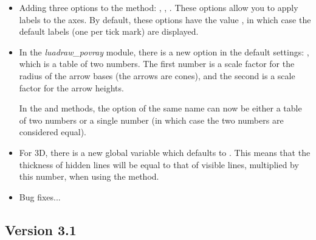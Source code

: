 \begin{itemize}
    \item Adding three options to the  method: , , . These options allow you to apply labels to the axes. By default, these options have the value \nil, in which case the default labels (one per tick mark) are displayed.

    \item In the \emph{luadraw\_povray} module, there is a new option in the default settings: , which is a table of two numbers. The first number is a scale factor for the radius of the arrow bases (the arrows are cones), and the second is a scale factor for the arrow heights.

    In the  and  methods, the option of the same name can now be either a table of two numbers or a single number (in which case the two numbers are considered equal).
    
    \item For 3D, there is a new global variable  which defaults to . This means that the thickness of hidden lines will be equal to that of visible lines, multiplied by this number, when using the  method.
    
    \item Bug fixes...
\end{itemize}

\subsection{Version 3.1}

